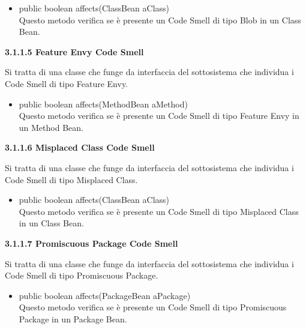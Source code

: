 \documentclass[11pt]{article}
\begin{document}
\begin{description}
		\begin{itemize}
			\item public boolean affects(ClassBean aClass)\\
			Questo metodo verifica se è presente un Code Smell di tipo Blob in un Class Bean.
		\end{itemize}
		\item \textbf{ 3.1.1.5 Feature Envy Code Smell}
		\item Si tratta di una classe che funge da interfaccia del sottosistema che individua i Code Smell di tipo Feature Envy.		
		\begin{itemize}
			\item public boolean affects(MethodBean aMethod)\\
			Questo metodo verifica se è presente un Code Smell di tipo Feature Envy in un Method Bean.
		\end{itemize}
		\item \textbf{ 3.1.1.6 Misplaced Class Code Smell} 
		\item Si tratta di una classe che funge da interfaccia del sottosistema che individua i Code Smell di tipo Misplaced Class.		
		\begin{itemize}
			\item public boolean affects(ClassBean aClass)\\
			Questo metodo verifica se è presente un Code Smell di tipo Misplaced Class in un Class Bean.
		\end{itemize}
		\item \textbf{ 3.1.1.7 Promiscuous Package Code Smell} 
		\item Si tratta di una classe che funge da interfaccia del sottosistema che individua i Code Smell di tipo Promiscuous Package.		
		\begin{itemize}
			\item public boolean affects(PackageBean aPackage)\\
			Questo metodo verifica se è presente un Code Smell di tipo Promiscuous Package in un Package Bean.
		\end{itemize}
\end{description}
\end{document}
